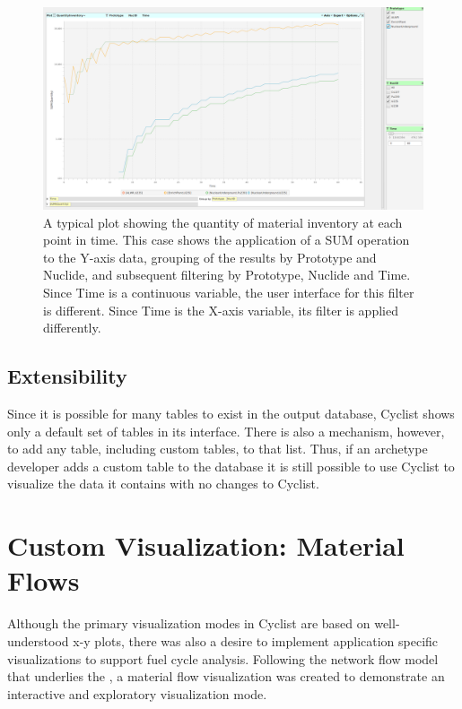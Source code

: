 \begin{figure}[htbp]
  \centering
  \includegraphics[width=\columnwidth]{./images/plot-01-07}
  \caption{A typical plot showing the quantity of material inventory at each
    point in time.  This case shows the application of a SUM operation to the
    Y-axis data, grouping of the results by Prototype and Nuclide, and
    subsequent filtering by Prototype, Nuclide and Time.  Since Time is a
    continuous variable, the user interface for this filter is different.  Since
    Time is the X-axis variable, its filter is applied differently.  }
  \label{fig:plot-01-07}
\end{figure}

\subsection{Extensibility}

Since it is possible for many tables to exist in the \Cyclus output database,
Cyclist shows only a default set of tables in its interface.  There is also a
mechanism, however, to add any table, including custom tables, to that list.
Thus, if an archetype developer adds a custom table to the database it is
still possible to use Cyclist to visualize the data it contains with no
changes to Cyclist.

\section{Custom Visualization: Material Flows}

Although the primary visualization modes in Cyclist are based on
well-understood x-y plots, there was also a desire to implement application
specific visualizations to support fuel cycle analysis.  Following the network
flow model that underlies the \Cyclus, a material flow visualization was
created to demonstrate an interactive and exploratory visualization mode.

